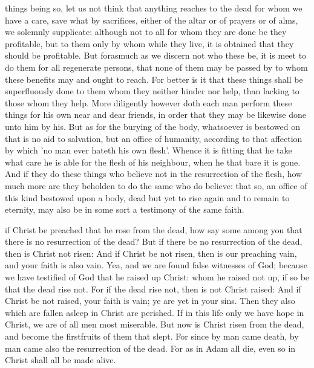  things being so, let us not think that anything reaches to the dead for whom we have a care, save what by sacrifices, either of the altar or of prayers or of alms, we solemnly supplicate: although not to all for whom they are done be they profitable, but to them only by whom while they live, it is obtained that they should be profitable. But forasmuch as we discern not who these be, it is meet to do them for all regenerate persons, that none of them may be passed by to whom these benefits may and ought to reach. For better is it that these things shall be superfluously done to them whom they neither hinder nor help, than lacking to those whom they help. More diligently however doth each man perform these things for his own near and dear friends, in order that they may be likewise done unto him by his. But as for the burying of the body, whatsoever is bestowed on that is no aid to salvation, but an office of humanity, according to that affection by which 'no man ever hateth his own flesh'. Whence it is fitting that he take what care he is able for the flesh of his neighbour, when he that bare it is gone. And if they do these things who believe not in the resurrection of the flesh, how much more are they beholden to do the same who do believe: that so, an office of this kind bestowed upon a body, dead but yet to rise again and to remain to eternity, may also be in some sort a testimony of the same faith.

 if Christ be preached that he rose from the dead, how say some among you that there is no resurrection of the dead? But if there be no resurrection of the dead, then is Christ not risen: And if Christ be not risen, then is our preaching vain, and your faith is also vain. Yea, and we are found false witnesses of God; because we have testified of God that he raised up Christ: whom he raised not up, if so be that the dead rise not. For if the dead rise not, then is not Christ raised: And if Christ be not raised, your faith is vain; ye are yet in your sins. Then they also which are fallen asleep in Christ are perished. If in this life only we have hope in Christ, we are of all men most miserable. But now is Christ risen from the dead, and become the firstfruits of them that slept. For since by man came death, by man came also the resurrection of the dead. For as in Adam all die, even so in Christ shall all be made alive.

